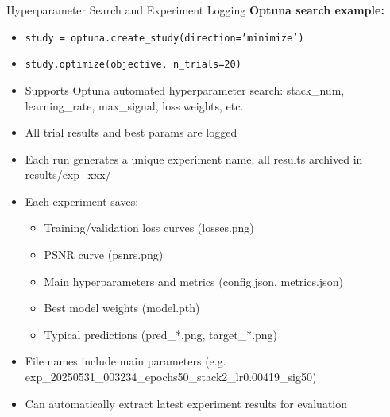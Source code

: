 \documentclass{beamer}
\begin{document}
\begin{frame}{Hyperparameter Search and Experiment Logging}
\textbf{Optuna search example:}
\begin{itemize}
    \item \texttt{study = optuna.create_study(direction='minimize')}
    \item \texttt{study.optimize(objective, n_trials=20)}
\end{itemize}
\vspace{0.5em}
\begin{itemize}
    \item Supports Optuna automated hyperparameter search: stack_num, learning_rate, max_signal, loss weights, etc.
    \item All trial results and best params are logged
    \item Each run generates a unique experiment name, all results archived in results/exp_xxx/
    \item Each experiment saves:
    \begin{itemize}
        \item Training/validation loss curves (losses.png)
        \item PSNR curve (psnrs.png)
        \item Main hyperparameters and metrics (config.json, metrics.json)
        \item Best model weights (model.pth)
        \item Typical predictions (pred_*.png, target_*.png)
    \end{itemize}
    \item File names include main parameters (e.g. exp_20250531_003234_epochs50_stack2_lr0.00419_sig50)
    \item Can automatically extract latest experiment results for evaluation
\end{itemize}
\end{frame}
\end{document}
